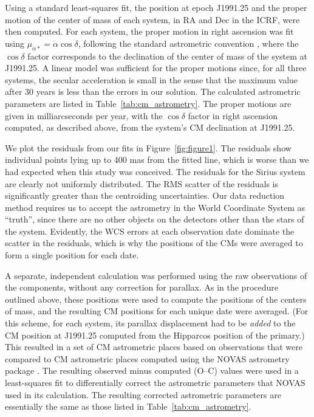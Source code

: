 \documentclass[linenumbers,trackchanges]{aastex701}
\begin{document}
Using a standard least-squares fit, the position at epoch J1991.25 and the proper motion of the center of mass of each
system, in RA and Dec in the ICRF, were then computed. For each system, the proper motion in right ascension was fit
using $\mu_{\alpha*} = \dot{\alpha}\cos\delta$, following the standard astrometric convention
\citep{vanLeeuwen2007,Lindegren2021}, where the $\cos\delta$ factor corresponds to the declination of the center of mass
of the system at J1991.25. A linear model was sufficient for the proper motions since, for all three systems, the
secular acceleration is small in the sense that the maximum value after 30 years is less than the errors in our
solution. The calculated astrometric parameters are listed in Table~\ref{tab:cm_astrometry}. The proper motions are
given in milliarcseconds per year, with the $\cos\delta$ factor in right ascension computed, as described above, from
the system's CM declination at J1991.25. 

We plot the residuals from our fits in Figure~\ref{fig:figure1}. The residuals show individual points lying up to 400
mas from the fitted line, which is worse than we had expected when this study was conceived. The residuals for the
Sirius system are clearly not uniformly distributed. The RMS scatter of the residuals is significantly greater than the
centroiding uncertainties. Our data reduction method requires us to accept the astrometry in the World Coordinate
System as ``truth'', since there are no other objects on the detectors other than the stars of the system. Evidently,
the WCS errors at each observation date dominate the scatter in the residuals, which is why the positions of the CMs
were averaged to form a single position for each date.

A separate, independent calculation was performed using the raw observations of the components, without any correction
for parallax. As in the procedure outlined above, these positions were used to compute the positions of the centers of
mass, and the resulting CM positions for each unique date were averaged. (For this scheme, for each system, its
parallax displacement had to be {\it added} to the CM position at J1991.25 computed from the Hipparcos position of the
primary.)   This resulted in a set of CM astrometric places based on observations that were compared to CM astrometric
places computed using the NOVAS astrometry package \citep{2012ascl.soft02003K}. The resulting observed minus computed
(O--C) values were used in a least-squares fit to differentially correct the astrometric parameters that NOVAS used in
its calculation. The resulting corrected astrometric parameters are essentially the same as those listed in
Table~\ref{tab:cm_astrometry}. 
\end{document}
